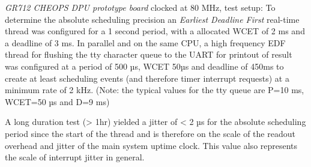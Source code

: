 \emph{GR712 CHEOPS DPU prototype board} clocked at 80 MHz, test setup:
To determine the absolute scheduling precision an \emph{Earliest Deadline First}
real-time thread was configured for a 1 second period, with a
allocated WCET of 2 ms and a deadline of 3 ms. In parallel and on the same
CPU, a high frequency EDF thread for flushing the tty character queue to
the UART for printout of result was configured at a period of 500 µs, WCET 50µs
and deadline of 450ms to create at least scheduling events (and therefore timer
interrupt requests) at a minimum rate of 2 kHz.
(Note: the typical values for the tty queue are P=10 ms, WCET=50 µs and D=9 ms)

A long duration test (> 1hr) yielded a jitter of < 2 µs for the
absolute scheduling period since the start of the thread and is therefore
on the scale of the readout overhead and jitter of the main system uptime clock.
This value also represents the scale of interrupt jitter in general.


